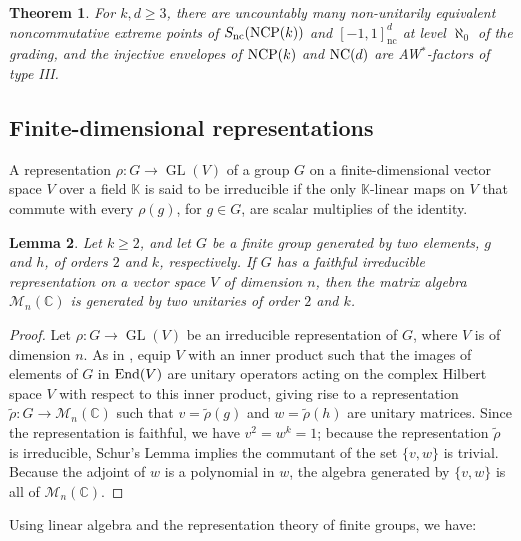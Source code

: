 \documentclass{amsart}
\newtheorem{theorem}{Theorem}[section]
\newtheorem{lemma}[theorem]{Lemma}
\theoremstyle{definition}
\theoremstyle{remark}
\newcommand{\M}{\mathcal{M}}
\numberwithin{equation}{section}
\begin{document}
\begin{theorem}\label{bo} For $k,d\geq 3$,
there are uncountably many non-unitarily equivalent noncommutative extreme points of  
$S_{\textrm{nc}}(\mbox{\textrm{NCP}}(k))$ 
 and $[-1,1]^d_{\textrm{nc}}$
at level $\aleph_0$ of the grading, and the injective envelopes of $\mbox{\textrm{NCP}}(k)$ and $\mbox{\textrm{NC}}(d)$
are AW$^*$-factors of type III.
\end{theorem}

\subsection{Finite-dimensional representations}
A representation 
$\rho : G\rightarrow \operatorname{GL}(V)$ of a group $G$ on a finite-dimensional vector space $V$ over a field $\mathbb K$
is said to be irreducible if the only $\mathbb K$-linear maps on $V$ that commute with every $\rho(g)$, for $g\in G$, 
are scalar multiplies of the identity.

\begin{lemma}\label{representation_lemma}
	Let $k\geq 2$, and let $G$ be a finite group generated by two elements, $g$ and $h$, of orders $2$ and $k$, respectively. 
	If $G$ has a faithful irreducible representation 
	on a vector space $V$ of dimension $n$, then the matrix algebra $\M_n(\mathbb C)$ is generated by two unitaries
	of order $2$ and $k$.
\end{lemma}
\begin{proof}
	Let  $\rho : G\rightarrow \operatorname{GL}(V)$ be an irreducible representation of $G$, where $V$ is of dimension $n$. 
	As in \cite[Theorem II.1.1]{simon-book}, equip $V$ with an inner product such that the images of elements of $G$ in $\mbox{\textrm End}(V)$ are unitary operators acting on the complex	
	Hilbert space $V$ with respect to this inner product, giving rise to a representation $\tilde{\rho} : G\rightarrow \M_n(\mathbb C)$ 
	such that $v=\tilde{\rho}(g)$ and $w=\tilde{\rho}(h)$ are unitary matrices. Since the representation is faithful, we have $v^2=w^k=1$; 
	because the representation $\tilde{\rho}$ is irreducible, Schur's Lemma \cite[Theorem II.4.1]{simon-book} implies the 
	commutant of the set $\{v,w\}$ is trivial. Because the adjoint of $w$ is a polynomial in $w$, the algebra generated by $\{v,w\}$ is all of $\M_n(\mathbb C)$.
	 \end{proof}

Using linear algebra and the representation theory of finite groups, we have:
	 
\end{document}
